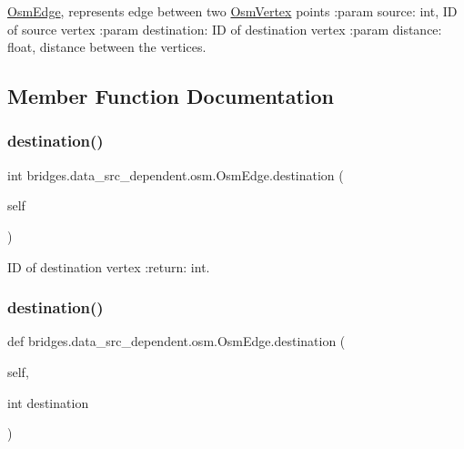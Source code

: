 \mbox{\hyperlink{classbridges_1_1data__src__dependent_1_1osm_1_1_osm_edge}{Osm\+Edge}}, represents edge between two \mbox{\hyperlink{classbridges_1_1data__src__dependent_1_1osm_1_1_osm_vertex}{Osm\+Vertex}} points \+:param source\+: int, ID of source vertex \+:param destination\+: ID of destination vertex \+:param distance\+: float, distance between the vertices. 



\subsection{Member Function Documentation}
\mbox{\label{classbridges_1_1data__src__dependent_1_1osm_1_1_osm_edge_ab59e74b81084f83a903a31e106bf3d16}} 
\subsubsection{\texorpdfstring{destination()}{destination()}\hspace{0.1cm}{\footnotesize\ttfamily [1/3]}}
{\footnotesize\ttfamily  int bridges.\+data\+\_\+src\+\_\+dependent.\+osm.\+Osm\+Edge.\+destination (\begin{DoxyParamCaption}\item[{}]{self }\end{DoxyParamCaption})}



ID of destination vertex \+:return\+: int. 

\mbox{\label{classbridges_1_1data__src__dependent_1_1osm_1_1_osm_edge_a0f6edd3387c5f5e283750f8b0d4187ea}} 
\subsubsection{\texorpdfstring{destination()}{destination()}\hspace{0.1cm}{\footnotesize\ttfamily [2/3]}}
{\footnotesize\ttfamily def bridges.\+data\+\_\+src\+\_\+dependent.\+osm.\+Osm\+Edge.\+destination (\begin{DoxyParamCaption}\item[{}]{self,  }\item[{int}]{destination }\end{DoxyParamCaption})}

